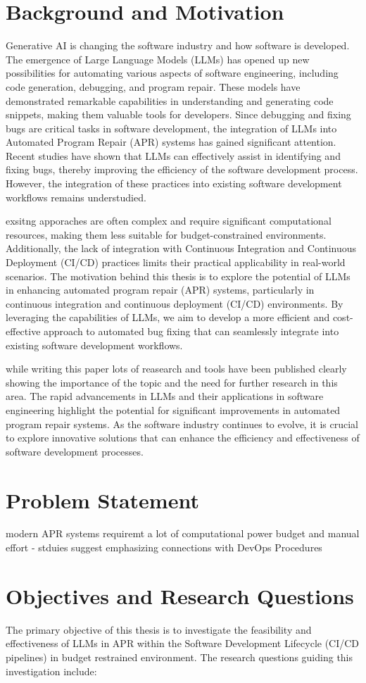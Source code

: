 \section{Background and Motivation}
Generative AI is changing the software industry and how software is developed. The emergence of Large Language Models (LLMs) has opened up new possibilities for automating various aspects of software engineering, including code generation, debugging, and program repair. These models have demonstrated remarkable capabilities in understanding and generating code snippets, making them valuable tools for developers.
Since debugging and fixing bugs are critical tasks in software development, the integration of LLMs into Automated Program Repair (APR) systems has gained significant attention. Recent studies have shown that LLMs can effectively assist in identifying and fixing bugs, thereby improving the efficiency of the software development process.
However, the integration of these practices into existing software development workflows remains understudied. 

exsitng apporaches are often complex and require significant computational resources, making them less suitable for budget-constrained environments. Additionally, the lack of integration with Continuous Integration and Continuous Deployment (CI/CD) practices limits their practical applicability in real-world scenarios.
The motivation behind this thesis is to explore the potential of LLMs in enhancing automated program repair (APR) systems, particularly in continuous integration and continuous deployment (CI/CD) environments. By leveraging the capabilities of LLMs, we aim to develop a more efficient and cost-effective approach to automated bug fixing that can seamlessly integrate into existing software development workflows.


while writing this paper lots of reasearch and tools have been published clearly showing the importance of the topic and the need for further research in this area. The rapid advancements in LLMs and their applications in software engineering highlight the potential for significant improvements in automated program repair systems. As the software industry continues to evolve, it is crucial to explore innovative solutions that can enhance the efficiency and effectiveness of software development processes.


\section{Problem Statement}
modern APR systems requiremt a lot of computational power budget and manual effort - stduies suggest emphasizing connections with DevOps Procedures \cite{puvvadiCodingAgentsComprehensive2025}


\section{Objectives and Research Questions}
The primary objective of this thesis is to investigate the feasibility and effectiveness of LLMs in APR within the Software Development Lifecycle (CI/CD pipelines) in budget restrained environment. The research questions guiding this investigation include: